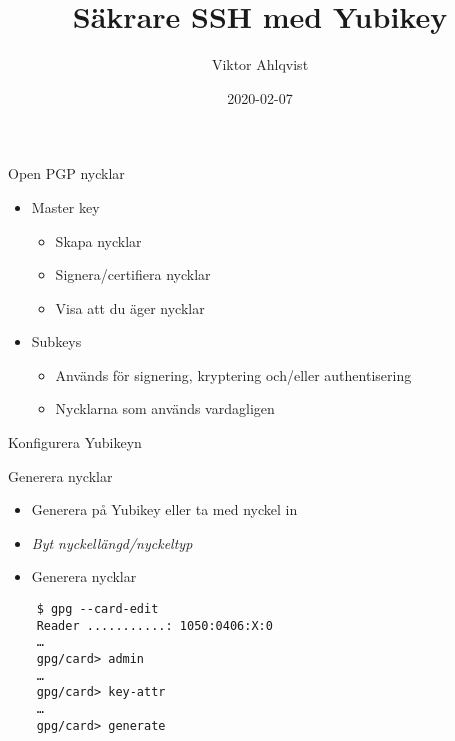 \documentclass{beamer}
\title{Säkrare SSH med Yubikey}
\date{2020-02-07}
\author{Viktor Ahlqvist}
\institute{Omegapoint kompetensdag}
\begin{document}
\maketitle


\begin{frame}{Open PGP nycklar}
  \begin{itemize}
    \item Master key
      \begin{itemize}
        \item Skapa nycklar
        \item Signera/certifiera nycklar
        \item Visa att du äger nycklar
      \end{itemize}
    \item Subkeys
      \begin{itemize}
        \item Används för signering, kryptering och/eller authentisering
        \item Nycklarna som används vardagligen
      \end{itemize}
  \end{itemize}
\end{frame}

\begin{frame}[fragile]{Konfigurera Yubikeyn}
\end{frame}

\begin{frame}[fragile]{Generera nycklar}
  \begin{itemize}
    \item Generera på Yubikey eller ta med nyckel in
    \item \emph{Byt nyckellängd/nyckeltyp}
    \item Generera nycklar
  \end{itemize}

  \begin{verbatim}
    $ gpg --card-edit
    Reader ...........: 1050:0406:X:0
    …
    gpg/card> admin
    …
    gpg/card> key-attr
    …
    gpg/card> generate
  \end{verbatim}
\end{frame}
\end{document}
